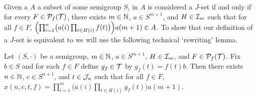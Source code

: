 Given a $A$ a subset of some semigroup $S$, in \cite[Definition 2.2(a)]{Hindman:2009vn} $A$ is considered a $J$-set if and only if for every $F \in \mathcal{P}_f(\mathcal{T})$, there exists $m \in \mathbb{N}$, $a \in S^{m+1}$, and $H \in \mathcal{I}_m$ such that for all $f \in F$, $\Bigl( \prod_{i=1}^n\bigl( a(i) \prod_{t \in H(i)} f(t) \bigr) \Bigr) a(m+1) \in A$.
To show that our definition of a $J$-set is equivalent to \cite[Definition 2.2(a)]{Hindman:2009vn} we will use the following technical `rewriting' lemma.

\begin{lem}
  \label{lem:rewrite-jset}
  Let $(S, \cdot)$ be a semigroup, $m \in \mathbb{N}$, $a \in S^{m+1}$, $H \in \mathcal{I}_m$, and $F \in \mathcal{P}_f(\mathcal{T})$. 
  Fix $b \in S$ and for each $f \in F$ define $g_f \in \mathcal{T}$ by $g_f(t) = f(t)b$. 
  Then there exists $n \in \mathbb{N}$, $c \in S^{n+1}$, and $t \in \mathcal{J}_n$ such that for all $f \in F$, $x(n, c, t, f) = \prod_{i=1}^m \bigl( a(i) \prod_{t \in H(i)} g_f(t)\big) a(m+1)$.
\end{lem}
